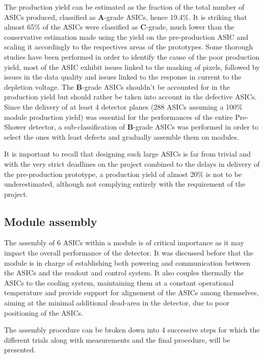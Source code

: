 			The production yield can be estimated as the fraction of the total number of ASICs produced, classified as \textbf{A}-grade ASICs, hence 19.4\%. It is striking that almost 65\% of the ASICs were classified as \textbf{C}-grade, much lower than the conservative estimation made using the yield on the pre-production ASIC and scaling it accordingly to the respectives areas of the prototypes. Some thorough studies have been performed in order to identify the cause of the poor production yield, most of the ASIC exhibit issues linked to the masking of pixels, followed by issues in the data quality and issues linked to the response in current to the depletion voltage. 
			The \textbf{B}-grade ASICs shouldn't be accounted for in the production yield but should rather be taken into account in the defective ASICs. Since the delivery of at least 4 detector planes (288 ASICs assuming a 100\% module production yield) was essential for the performances of the entire Pre-Shower detector, a sub-classification of \textbf{B}-grade ASICs was performed in order to select the ones with least defects and gradually assemble them on modules. 
			
			 It is important to recall that designing such large ASICs is far from trivial and with the very strict deadlines on the project combined to the delays in delivery of the pre-production prototype, a production yield of almost 20\% is not to be underestimated, although not complying entirely with the requirement of the project. 
			 \clearpage
			
		
		\subsection{Module assembly}
		
		The assembly of 6 ASICs within a module is of critical importance as it may impact the overall performance of the detector. It was discussed before that the module is in charge of establishing both powering and communication between the ASICs and the readout and control system. It also couples thermally the ASICs to the cooling system, maintaining them at a constant operational temperature and provide support for alignement of the ASICs among themselves, aiming at the minimal additional dead-area in the detector, due to poor positioning of the ASICs. 
		
		The assembly procedure can be broken down into 4 successive steps for which the different trials along with measurements and the final procedure, will be presented.  
